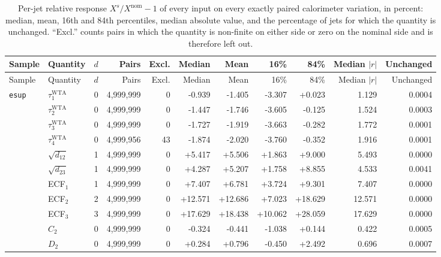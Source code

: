 {\footnotesize\setlength{\tabcolsep}{3.5pt}
\begin{longtable}{llrrrrrrrrr}
\caption{Per-jet relative response $X^{s}/X^{\mathrm{nom}}-1$ of every input on every exactly paired calorimeter variation, in percent: median, mean, 16th and 84th percentiles, median absolute value, and the percentage of jets for which the quantity is unchanged. ``Excl.'' counts pairs in which the quantity is non-finite on either side or zero on the nominal side and is therefore left out.}\label{tab:supp-feature-response}\\
\toprule
Sample & Quantity & $d$ & Pairs & Excl. & Median & Mean & 16\% & 84\% & Median $|r|$ & Unchanged \\
\midrule
\endfirsthead
\toprule
Sample & Quantity & $d$ & Pairs & Excl. & Median & Mean & 16\% & 84\% & Median $|r|$ & Unchanged \\
\midrule
\endhead
\bottomrule
\endfoot
\texttt{esup} & $\tau_1^{\mathrm{WTA}}$ & 0 & 4{,}999{,}999 & 0 & -0.939 & -1.405 & -3.307 & +0.023 & 1.129 & 0.0004 \\
 & $\tau_2^{\mathrm{WTA}}$ & 0 & 4{,}999{,}999 & 0 & -1.447 & -1.746 & -3.605 & -0.125 & 1.524 & 0.0003 \\
 & $\tau_3^{\mathrm{WTA}}$ & 0 & 4{,}999{,}999 & 0 & -1.727 & -1.919 & -3.663 & -0.282 & 1.772 & 0.0001 \\
 & $\tau_4^{\mathrm{WTA}}$ & 0 & 4{,}999{,}956 & 43 & -1.874 & -2.020 & -3.760 & -0.352 & 1.916 & 0.0001 \\
 & $\sqrt{d_{12}}$ & 1 & 4{,}999{,}999 & 0 & +5.417 & +5.506 & +1.863 & +9.000 & 5.493 & 0.0000 \\
 & $\sqrt{d_{23}}$ & 1 & 4{,}999{,}999 & 0 & +4.287 & +5.207 & +1.758 & +8.855 & 4.533 & 0.0041 \\
 & ECF$_1$ & 1 & 4{,}999{,}999 & 0 & +7.407 & +6.781 & +3.724 & +9.301 & 7.407 & 0.0000 \\
 & ECF$_2$ & 2 & 4{,}999{,}999 & 0 & +12.571 & +12.686 & +7.023 & +18.629 & 12.571 & 0.0000 \\
 & ECF$_3$ & 3 & 4{,}999{,}999 & 0 & +17.629 & +18.438 & +10.062 & +28.059 & 17.629 & 0.0000 \\
 & $C_2$ & 0 & 4{,}999{,}999 & 0 & -0.324 & -0.441 & -1.038 & +0.144 & 0.422 & 0.0005 \\
 & $D_2$ & 0 & 4{,}999{,}999 & 0 & +0.284 & +0.796 & -0.450 & +2.492 & 0.696 & 0.0007 \\

\end{longtable}}
